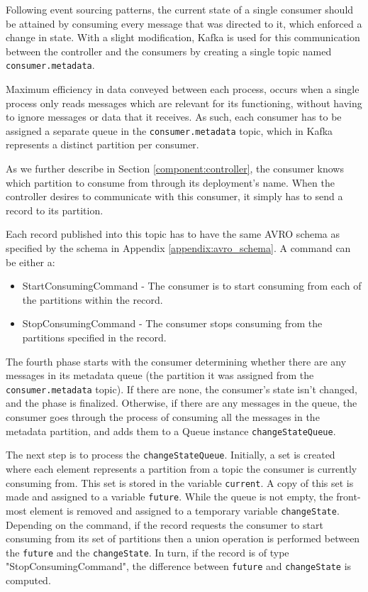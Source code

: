 Following event sourcing patterns, the current state of a single consumer should
be attained by consuming every message that was directed to it, which enforced a
change in state. With a slight modification, Kafka is used for this
communication between the controller and the consumers by creating a single
topic named \lstinline{consumer.metadata}.

Maximum efficiency in data conveyed between each process, occurs when a single
process only reads messages which are relevant for its functioning, without
having to ignore messages or data that it receives. As such, each consumer has
to be assigned a separate queue in the
\lstinline[language=Python]{consumer.metadata} topic, which in Kafka represents
a distinct partition per consumer.

As we further describe in Section \ref{component:controller}, the consumer
knows which partition to consume from through its deployment's name. When the
controller desires to communicate with this consumer, it simply has to send a
record to its partition. 

Each record published into this topic has to have the same AVRO schema as
specified by the schema in Appendix \ref{appendix:avro_schema}. A command can be either
a: 
\begin{itemize} 
    \item StartConsumingCommand - The consumer is to start
        consuming from each of the partitions within the record.  
    \item StopConsumingCommand - The consumer stops consuming from the
        partitions specified in the record.  
\end{itemize}

The fourth phase starts with the consumer determining whether there are any
messages in its metadata queue (the partition it was assigned from the
\lstinline{consumer.metadata} topic). If there are none, the consumer's state
isn't changed, and the phase is finalized. Otherwise, if there are any messages
in the queue, the consumer goes through the process of consuming all the
messages in the metadata partition, and adds them to a Queue instance
\lstinline{changeStateQueue}.

The next step is to process the \lstinline{changeStateQueue}. Initially, a set
is created where each element represents a partition from a topic the consumer
is currently consuming from. This set is stored in the variable
\lstinline{current}. A copy of this set is made and assigned to a variable
\lstinline{future}. While the queue is not empty, the front-most element is
removed and assigned to a temporary variable \lstinline{changeState}. Depending
on the command, if the record requests the consumer to start consuming from its
set of partitions then a union operation is performed between the
\lstinline{future} and the \lstinline{changeState}. In turn, if the record is of
type "StopConsumingCommand", the difference between \lstinline{future} and
\lstinline{changeState} is computed.

